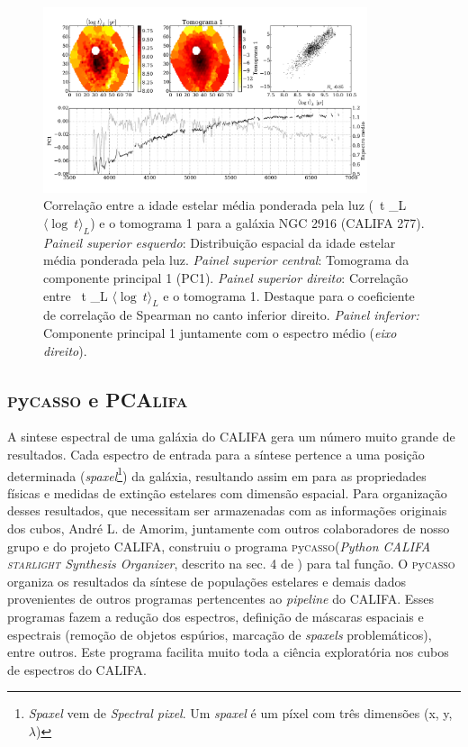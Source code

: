 \documentclass[a4paper,12pt]{article}
\newcommand\pycasso{\textsc{p}y\textsc{casso}\xspace}
\newcommand\pcalifa{PCA\textsc{lifa}\xspace}
\newcommand{\meanL}[1]{\relax\ifmmode \langle #1 \rangle_L \else $\langle #1 \rangle_L$\xspace \fi}
\def\starlight{\textsc{starlight}\xspace}      %
\begin{document}
\begin{figure}
	\begin{center}
    \includegraphics[width=0.85\textwidth]{figuras/K0277-f_obs_norm_pc_1_prop_0.pdf}
    \caption[]{Correla\c{c}\~ao entre a idade estelar média ponderada pela luz (\meanL{\log\ t}) e o tomograma 1 para a galáxia NGC 2916 (CALIFA 277).
    {\em Paineil superior esquerdo}: Distribui\c{c}\~ao espacial da idade estelar média ponderada pela luz. {\em Painel superior central}:
    Tomograma da componente principal 1 (PC1). {\em Painel superior direito}: Correla\c{c}\~ao entre \meanL{\log\ t} e o tomograma 1. Destaque para o
    coeficiente de correla\c{c}\~ao de Spearman no canto inferior direito. {\em Painel inferior:} Componente principal 1 juntamente com o espectro
    médio ({\em eixo direito}).}
    \label{fig:K0277corre}
    \end{center}
\end{figure}

\subsection{\pycasso e \pcalifa}

A sintese espectral de uma galáxia do CALIFA gera um número muito grande de resultados. Cada espectro de entrada para a síntese pertence a uma posição
determinada ({\em spaxel}\footnote{{\em Spaxel} vem de {\em Spectral pixel}. Um {\em spaxel} é um píxel com três dimensões (x, y, $\lambda$)}) da
galáxia, resultando assim em para as propriedades físicas e medidas de extinção estelares com dimensão espacial. Para organização desses resultados,
que necessitam ser armazenadas com as informações originais dos cubos, André L. de Amorim, juntamente com outros colaboradores de nosso grupo e do
projeto CALIFA, construiu o programa \pycasso ({\em Python CALIFA \starlight Synthesis Organizer}, descrito na sec. 4 de \citet{CidFernandes2013})
para tal função. O \pycasso organiza os resultados da síntese de populações estelares e demais dados provenientes de outros programas pertencentes ao
{\em pipeline} do CALIFA. Esses programas fazem a redução dos espectros, definição de máscaras espaciais e espectrais (remoção de objetos espúrios,
marcação de {\em spaxels} problemáticos), entre outros. Este programa facilita muito toda a ciência exploratória nos cubos de espectros do CALIFA.
\end{document}
